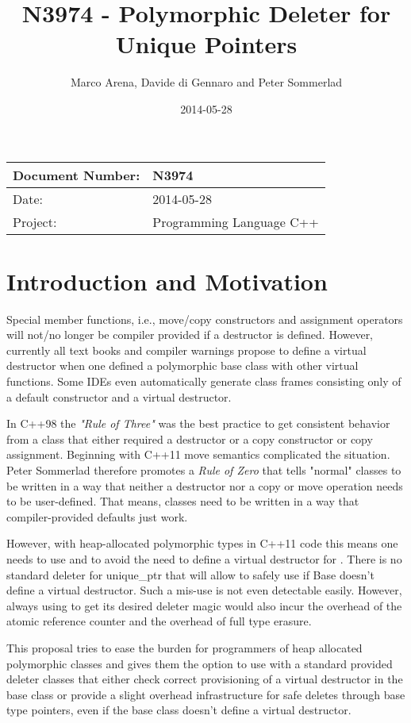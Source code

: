 \documentclass[ebook,11pt,article]{memoir}
\title{N3974 - Polymorphic Deleter for Unique Pointers}
\author{Marco Arena, Davide di Gennaro and Peter Sommerlad}
\date{2014-05-28}                                           %
\begin{document}
\maketitle
\begin{tabular}[t]{|l|l|}\hline 
Document Number: & N3974 \\\hline
Date: & 2014-05-28 \\\hline
Project: & Programming Language C++\\\hline 
\end{tabular}

\chapter{Introduction and Motivation}

Special member functions, i.e., move/copy constructors and assignment operators will not/no longer be compiler provided if a destructor is defined. However, currently all text books and compiler warnings propose to define a virtual destructor when one defined a polymorphic base class with other virtual functions. Some IDEs even automatically generate class frames consisting only of a default constructor and a virtual destructor. 

In C++98 the \emph{"Rule of Three"} was the best practice to get consistent behavior from a class that either required a destructor or a copy constructor or copy assignment. Beginning with C++11 move semantics complicated the situation. Peter Sommerlad therefore promotes a \emph{Rule of Zero} that tells "normal" classes to be written in a way that neither a destructor nor a copy or move operation needs to be user-defined. That means, classes need to be written in a way that compiler-provided defaults just work\texttrademark .

However, with heap-allocated polymorphic types in C++11 code this means one needs to use  and  to avoid the need to define a virtual destructor for . There is no standard deleter for unique_ptr that will allow to safely use  if Base doesn't define a virtual destructor. Such a mis-use is not even detectable easily. However, always using  to get its desired deleter magic would also incur the overhead of the atomic reference counter and the overhead of full type erasure.

This proposal tries to ease the burden for programmers of heap allocated polymorphic classes and gives them the option to use  with a standard provided deleter classes that either check correct provisioning of a virtual destructor in the base class or provide a slight overhead infrastructure for safe deletes through base type pointers, even if the base class doesn't define a virtual destructor.
\end{document}
